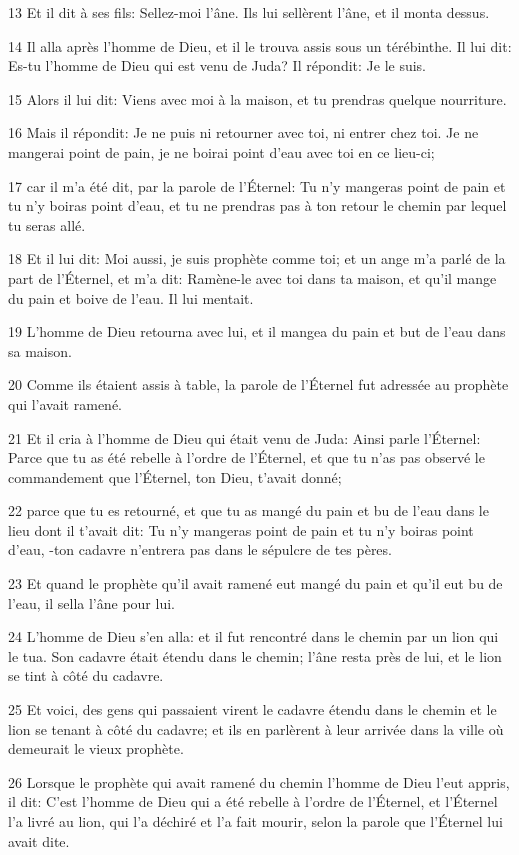 \par 13 Et il dit à ses fils: Sellez-moi l'âne. Ils lui sellèrent l'âne, et il monta dessus.
\par 14 Il alla après l'homme de Dieu, et il le trouva assis sous un térébinthe. Il lui dit: Es-tu l'homme de Dieu qui est venu de Juda? Il répondit: Je le suis.
\par 15 Alors il lui dit: Viens avec moi à la maison, et tu prendras quelque nourriture.
\par 16 Mais il répondit: Je ne puis ni retourner avec toi, ni entrer chez toi. Je ne mangerai point de pain, je ne boirai point d'eau avec toi en ce lieu-ci;
\par 17 car il m'a été dit, par la parole de l'Éternel: Tu n'y mangeras point de pain et tu n'y boiras point d'eau, et tu ne prendras pas à ton retour le chemin par lequel tu seras allé.
\par 18 Et il lui dit: Moi aussi, je suis prophète comme toi; et un ange m'a parlé de la part de l'Éternel, et m'a dit: Ramène-le avec toi dans ta maison, et qu'il mange du pain et boive de l'eau. Il lui mentait.
\par 19 L'homme de Dieu retourna avec lui, et il mangea du pain et but de l'eau dans sa maison.
\par 20 Comme ils étaient assis à table, la parole de l'Éternel fut adressée au prophète qui l'avait ramené.
\par 21 Et il cria à l'homme de Dieu qui était venu de Juda: Ainsi parle l'Éternel: Parce que tu as été rebelle à l'ordre de l'Éternel, et que tu n'as pas observé le commandement que l'Éternel, ton Dieu, t'avait donné;
\par 22 parce que tu es retourné, et que tu as mangé du pain et bu de l'eau dans le lieu dont il t'avait dit: Tu n'y mangeras point de pain et tu n'y boiras point d'eau, -ton cadavre n'entrera pas dans le sépulcre de tes pères.
\par 23 Et quand le prophète qu'il avait ramené eut mangé du pain et qu'il eut bu de l'eau, il sella l'âne pour lui.
\par 24 L'homme de Dieu s'en alla: et il fut rencontré dans le chemin par un lion qui le tua. Son cadavre était étendu dans le chemin; l'âne resta près de lui, et le lion se tint à côté du cadavre.
\par 25 Et voici, des gens qui passaient virent le cadavre étendu dans le chemin et le lion se tenant à côté du cadavre; et ils en parlèrent à leur arrivée dans la ville où demeurait le vieux prophète.
\par 26 Lorsque le prophète qui avait ramené du chemin l'homme de Dieu l'eut appris, il dit: C'est l'homme de Dieu qui a été rebelle à l'ordre de l'Éternel, et l'Éternel l'a livré au lion, qui l'a déchiré et l'a fait mourir, selon la parole que l'Éternel lui avait dite.
